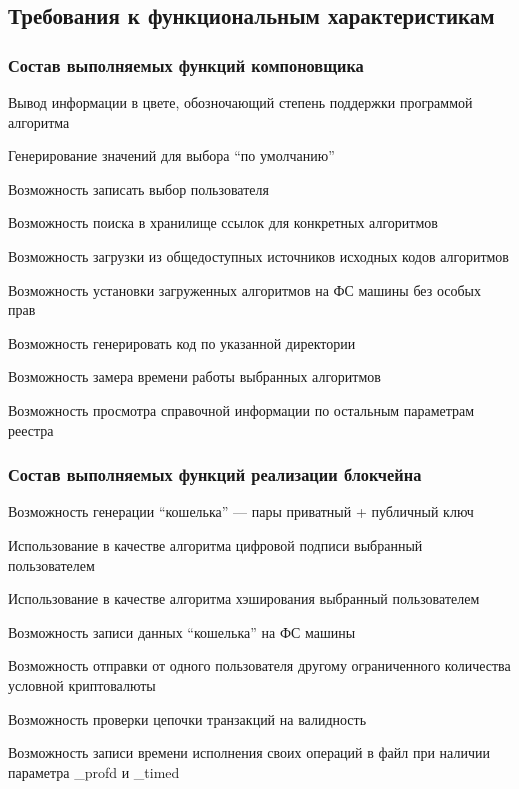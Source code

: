 \subsection{Требования к функциональным характеристикам}

\subsubsection{Состав выполняемых функций компоновщика}
\begin{my_enumerate}
    \item Вывод информации в цвете, обозночающий степень поддержки программой алгоритма
    \item Генерирование значений для выбора ``по умолчанию''
    \item Возможность записать выбор пользователя
    \item Возможность поиска в хранилище ссылок для конкретных алгоритмов
    \item Возможность загрузки из общедоступных источников исходных кодов алгоритмов
    \item Возможность установки загруженных алгоритмов на ФС машины без особых прав
    \item Возможность генерировать код по указанной директории
    \item Возможность замера времени работы выбранных алгоритмов
    \item Возможность просмотра справочной информации по остальным параметрам реестра
\end{my_enumerate}

\subsubsection{Состав выполняемых функций реализации блокчейна}
\begin{my_enumerate}
    \item Возможность генерации ``кошелька'' --- пары приватный + публичный ключ
    \item Использование в качестве алгоритма цифровой подписи выбранный пользователем
    \item Использование в качестве алгоритма хэширования выбранный пользователем
    \item Возможность записи данных ``кошелька'' на ФС машины
    \item Возможность отправки от одного пользователя другому ограниченного
          количества условной криптовалюты
    \item Возможность проверки цепочки транзакций на валидность
    \item Возможность записи времени исполнения своих операций в файл при
          наличии параметра \_profd и \_timed
\end{my_enumerate}

